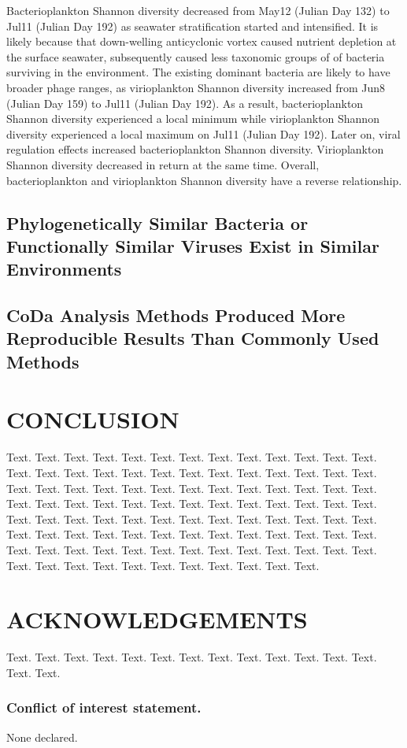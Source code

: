 \documentclass[a4,center,fleqn]{NAR}
\begin{document}
Bacterioplankton Shannon diversity decreased from May12 (Julian Day 132) to Jul11 (Julian Day 192) as seawater stratification started and intensified.
It is likely because that down-welling anticyclonic vortex caused nutrient depletion at the surface seawater, subsequently caused less taxonomic groups of of bacteria surviving in the environment.
The existing dominant bacteria are likely to have broader phage ranges, as virioplankton Shannon diversity increased from Jun8 (Julian Day 159) to Jul11 (Julian Day 192).
As a result, bacterioplankton Shannon diversity experienced a local minimum while virioplankton Shannon diversity experienced a local maximum on Jul11 (Julian Day 192).
Later on, viral regulation effects increased bacterioplankton Shannon diversity. 
Virioplankton Shannon diversity decreased in return at the same time.
Overall, bacterioplankton and virioplankton Shannon diversity have a reverse relationship.


\subsection{Phylogenetically Similar Bacteria or Functionally Similar Viruses Exist in Similar Environments}

\subsection{CoDa Analysis Methods Produced More Reproducible Results Than Commonly Used Methods}

\section{CONCLUSION}

Text. Text. Text. Text. Text. Text. Text. Text. Text. Text. Text.
Text. Text. Text. Text. Text. Text. Text. Text. Text. Text. Text.
Text. Text. Text. Text. Text. Text. Text. Text. Text. Text. Text.
Text. Text. Text. Text. Text. Text. Text. Text. Text. Text. Text.
Text. Text. Text. Text. Text. Text. Text. Text. Text. Text. Text.
Text. Text. Text. Text. Text. Text. Text. Text. Text. Text. Text.
Text. Text. Text. Text. Text. Text. Text. Text. Text. Text. Text.
Text. Text. Text. Text. Text. Text. Text. Text. Text. Text. Text.
Text. Text. Text. Text. Text. Text. Text. Text. Text. Text. Text.
Text. Text. Text.


\section{ACKNOWLEDGEMENTS}

Text. Text. Text. Text. Text. Text. Text. Text. Text. Text. Text.
Text. Text. Text. Text.


\subsubsection{Conflict of interest statement.} None declared.
\newpage



\end{document}
